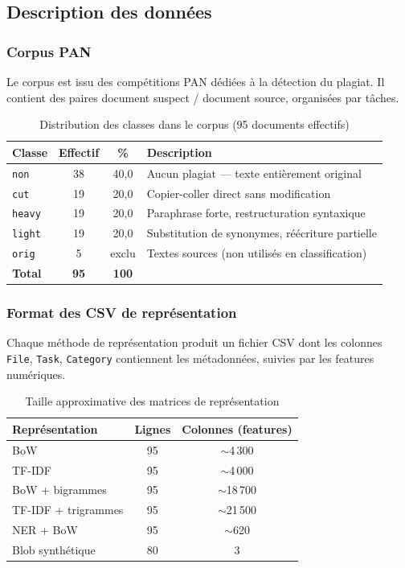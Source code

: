 \documentclass[12pt,a4paper]{article}
\begin{document}
\subsection{Description des données}

\subsubsection{Corpus PAN}
Le corpus est issu des compétitions PAN dédiées à la détection du plagiat. Il contient des paires document suspect / document source, organisées par tâches.

\begin{table}[H]
\centering
\caption{Distribution des classes dans le corpus (95 documents effectifs)}
\label{tab:corpus}
\begin{tabular}{lccl}
\toprule
\textbf{Classe} & \textbf{Effectif} & \textbf{\%} & \textbf{Description} \\
\midrule
\texttt{non}   & 38 & 40,0 & Aucun plagiat --- texte entièrement original \\
\texttt{cut}   & 19 & 20,0 & Copier-coller direct sans modification \\
\texttt{heavy} & 19 & 20,0 & Paraphrase forte, restructuration syntaxique \\
\texttt{light} & 19 & 20,0 & Substitution de synonymes, réécriture partielle \\
\midrule
\texttt{orig}  & 5  & exclu & Textes sources (non utilisés en classification) \\
\midrule
\textbf{Total} & \textbf{95} & \textbf{100} & \\
\bottomrule
\end{tabular}
\end{table}

\subsubsection{Format des CSV de représentation}
Chaque méthode de représentation produit un fichier CSV dont les colonnes \texttt{File}, \texttt{Task}, \texttt{Category} contiennent les métadonnées, suivies par les features numériques.

\begin{table}[H]
\centering
\caption{Taille approximative des matrices de représentation}
\label{tab:matrices}
\begin{tabular}{lcc}
\toprule
\textbf{Représentation} & \textbf{Lignes} & \textbf{Colonnes (features)} \\
\midrule
BoW                & 95 & $\sim$4\,300 \\
TF-IDF             & 95 & $\sim$4\,000 \\
BoW + bigrammes    & 95 & $\sim$18\,700 \\
TF-IDF + trigrammes & 95 & $\sim$21\,500 \\
NER + BoW          & 95 & $\sim$620 \\
Blob synthétique   & 80 & 3 \\
\bottomrule
\end{tabular}
\end{table}
\end{document}
